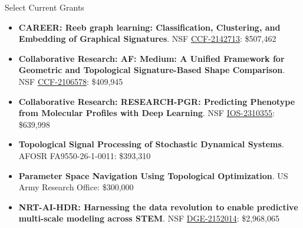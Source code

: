 \documentclass{resume} %
\begin{document}
\newpage
\begin{rSection}{Select Current Grants}


\begin{itemize}
   \itemsep -0.1em 
   \item \textbf{CAREER: Reeb graph learning: Classification, Clustering, and Embedding of Graphical Signatures}.
   NSF \href{https://nsf.gov/awardsearch/showAward?AWD_ID=2142713}{CCF-2142713}: \$507,462
   
   \item \textbf{Collaborative Research: AF: Medium: A Unified Framework for Geometric and Topological Signature-Based Shape Comparison}. 
   NSF \href{https://nsf.gov/awardsearch/showAward?AWD_ID=2106578}{CCF-2106578}: \$409,945
   
   \item \textbf{Collaborative Research: RESEARCH-PGR: Predicting Phenotype from Molecular Profiles with Deep Learning}. 
   NSF \href{https://nsf.gov/awardsearch/showAward?AWD_ID=2310355}{IOS-2310355}: \$639,998
   
   \item \textbf{Topological Signal Processing of Stochastic Dynamical Systems}. 
   AFOSR FA9550-26-1-0011: \$393,310
   
   \item \textbf{Parameter Space Navigation Using Topological Optimization}. 
   US Army Research Office: \$300,000
   
   \item \textbf{NRT-AI-HDR: Harnessing the data revolution to enable predictive multi-scale modeling across STEM}.  
   NSF \href{https://nsf.gov/awardsearch/showAward?AWD_ID=2152014}{DGE-2152014}: \$2,968,065
\end{itemize}



\end{rSection}
\end{document}
